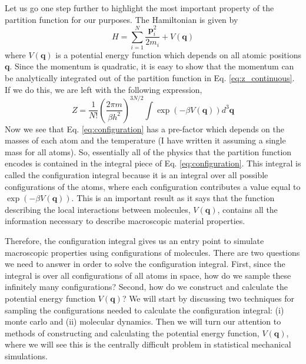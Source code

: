 \documentclass[11pt, proquest]{uwthesis}[2020/02/24]
\begin{document}
Let us go one step further to highlight the most important property of the partition function for our purposes. The Hamiltonian is given by
\begin{equation}
    H=\sum_{i=1}^N\frac{\mathbf{p}_i^2}{2m_i}+V(\mathbf{q})
    \label{eq:hamiltonian}
\end{equation}
where $V(\mathbf{q})$ is a potential energy function which depends on all atomic positions $\mathbf{q}$. Since the momentum is quadratic, it is easy to show that the momentum can be analytically integrated out of the partition function in Eq. \ref{eq:z_continuous}. If we do this, we are left with the following expression,
\begin{equation}
    Z=\frac{1}{N!}\left(\frac{2\pi m}{\beta h^2}\right)^{3N/2}\int \exp\left(-\beta V(\mathbf{q})\right)d^3\mathbf{q}
    \label{eq:configuration}
\end{equation}
Now we see that Eq. \ref{eq:configuration} has a pre-factor which depends on the masses of each atom and the temperature (I have written it assuming a single mass for all atoms). So, essentially all of the physics that the partition function encodes is contained in the integral piece of Eq. \ref{eq:configuration}. This integral is called the configuration integral because it is an integral over all possible configurations of the atoms, where each configuration contributes a value equal to $\exp\left(-\beta V(\mathbf{q})\right)$. This is an important result as it says that the function describing the local interactions between molecules, $V(\mathbf{q})$, contains all the information necessary to describe macroscopic material properties.

\par Therefore, the configuration integral gives us an entry point to simulate macroscopic properties using configurations of molecules. There are two questions we need to answer in order to solve the configuration integral. First, since the integral is over all configurations of all atoms in space, how do we sample these infinitely many configurations? Second, how do we construct and calculate the potential energy function $V(\mathbf{q})$? We will start by discussing two techniques for sampling the configurations needed to calculate the configuration integral: (i) monte carlo and (ii) molecular dynamics. Then we will turn our attention to methods of constructing and calculating the potential energy function, $V(\mathbf{q})$, where we will see this is the centrally difficult problem in statistical mechanical simulations.
\end{document}

